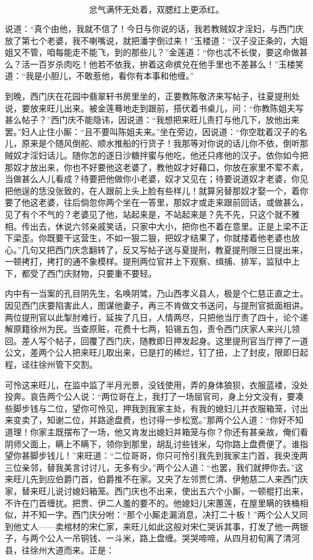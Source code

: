 \[
忿气满怀无处着，双腮红上更添红。
\]

说道：“真个由他，我就不信了！今日与你说的话，我若教贼奴才淫妇，与西门庆放了第七个老婆，我不喇嘴说，就把潘字倒过来！”玉楼道：“汉子没正条的，大姐姐又不管，咱每能走不能飞，到的那些儿？”金莲道：“你也忒不长俊，要这命做甚么？活一百岁杀肉吃！他若不依我，拚着这命摈兑在他手里也不差甚么！”玉楼笑道：“我是小胆儿，不敢惹他，看你有本事和他缠。”

到晚，西门庆在花园中翡翠轩书房里坐的，正要教陈敬济来写帖子，往夏提刑处说，要放来旺儿出来。被金莲蓦地走到跟前，搭伏着书桌儿，问：“你教陈姐夫写甚么帖子？”西门庆不能隐讳，因说道：“我想把来旺儿责打与他几下，放他出来罢。”妇人止住小厮：“且不要叫陈姐夫来。”坐在旁边，因说道：“你空耽着汉子的名儿，原来是个随风倒舵、顺水推船的行货子！我那等对你说的话儿你不依，倒听那贼奴才淫妇话儿。随你怎的逐日沙糖拌蜜与他吃，他还只疼他的汉子。依你如今把那奴才放出来，你也不好要他这老婆了，教他奴才好藉口，你放在家里不荤不素，当做甚么人儿看成？待要把他做你小老婆，奴才又见在；待要说道奴才老婆，你见把他逞的恁没张致的，在人跟前上头上脸有些样儿！就算另替那奴才娶一个，着你要了他这老婆，往后倘忽你两个坐在一答里，那奴才或走来跟前回话，或做甚么，见了有个不气的？老婆见了他，站起来是，不站起来是？先不先，只这个就不雅相。传出去，休说六邻亲戚笑话，只家中大小，把你也不着在意里。正是上梁不正下梁歪。你既要干这营生，不如一狠二狠，把奴才结果了，你就搂着他老婆也放心。”几句又把西门庆念翻转了，反又写帖子送与夏提刑，教夏提刑限三日提出来，一顿拷打，拷打的通不象模样。提刑两位官并上下观察、缉捕、排军，监狱中上下，都受了西门庆财物，只要重不要轻。

内中有一当案的孔目阴先生，名唤阴骘，乃山西孝义县人，极是个仁慈正直之士。因见西门庆要陷害此人，图谋他妻子，再三不肯做文书送问，与提刑官抵面相讲。两位提刑官以此掣肘难行，延挨了几日，人情两尽，只把他当厅责了四十，论个递解原籍徐州为民。当查原赃，花费十七两，铅锡五包，责令西门庆家人来兴儿领回。差人写个帖子，回覆了西门庆，随教即日押发起身。这里提刑官当厅押了一道公文，差两个公人把来旺儿取出来，已是打的稀烂，钉了扭，上了封皮，限即日起程，迳往徐州管下交割。

可怜这来旺儿，在监中监了半月光景，没钱使用，弄的身体狼狈，衣服蓝褛，没处投奔。哀告两个公人说：“两位哥在上，我打了一场屈官司，身上分文没有，要凑些脚步钱与二位，望你可怜见，押我到我家主处，有我的媳妇儿并衣服箱笼，讨出来变卖了，知谢二位，并路途盘费，也讨得一步松宽。”那两个公人道：“你好不知道理！你家主既摆布了一场，他又肯发出媳妇并箱笼与你？你还有甚亲故，俺们看阴师父面上，瞒上不瞒下，领你到那里，胡乱讨些钱米，勾你路上盘费便了。谁指望你甚脚步钱儿！”来旺道：“二位哥哥，你只可怜引我先到我家主门首，我央浼两三位亲邻，替我美言讨讨儿，无多有少。”两个公人道：“也罢，我们就押你去。”这来旺儿先到应伯爵门首，伯爵推不在家。又央了左邻贾仁清、伊勉慈二人来西门庆家，替来旺儿说讨媳妇箱笼。西门庆也不出来，使出五六个小厮，一顿棍打出来，不许在门首缠扰。把贾、伊二人羞的要不的。他媳妇儿宋蕙莲，在屋里瞒的铁桶相似，并不知一字。西门庆分咐：“那个小厮走漏消息，决打二十板！”两个公人又同到他丈人——卖棺材的宋仁家，来旺儿如此这般对宋仁哭诉其事，打发了他一两银子，与两个公人一吊铜钱、一斗米，路上盘缠。哭哭啼啼，从四月初旬离了清河县，往徐州大道而来。正是：

